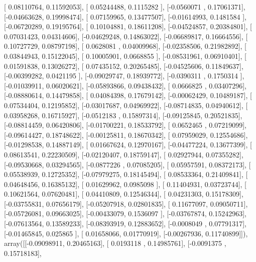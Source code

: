 \documentclass{article}
\begin{document}
       [ 0.08110764,  0.11592053],
       [ 0.05244488,  0.1115282 ],
       [-0.0560071 ,  0.17061371],
       [-0.04663628,  0.19998474],
       [ 0.07159965,  0.13477507],
       [-0.01614993,  0.1481584 ],
       [-0.06720289,  0.19195764],
       [ 0.10104881,  0.18611208],
       [-0.04524857,  0.20384801],
       [ 0.07031423,  0.04314606],
       [-0.04629248,  0.14863022],
       [-0.06689817,  0.16664556],
       [ 0.10727729,  0.08797198],
       [ 0.0628081 ,  0.04009968],
       [-0.02358506,  0.21982892],
       [ 0.03844943,  0.15122045],
       [ 0.10005901,  0.0668855 ],
       [-0.08531961,  0.06910401],
       [ 0.01591838,  0.13026272],
       [ 0.07435152,  0.20265485],
       [-0.04525606,  0.11849637],
       [-0.00399282,  0.0421195 ],
       [-0.09029747,  0.18939772],
       [-0.0390311 ,  0.1750314 ],
       [-0.01039911,  0.06020621],
       [-0.05893866,  0.09438432],
       [ 0.0666825 ,  0.03407296],
       [-0.08880614,  0.14479858],
       [ 0.04084398,  0.17679142],
       [-0.00062429,  0.10489187],
       [ 0.07534404,  0.12195852],
       [-0.03017687,  0.04969922],
       [-0.08714835,  0.04940612],
       [ 0.03958268,  0.16715927],
       [-0.0512183 ,  0.15897314],
       [-0.09125845,  0.20521835],
       [-0.08814459,  0.06420806],
       [-0.01700221,  0.18533792],
       [ 0.0652465 ,  0.07219099],
       [-0.09614427,  0.18748622],
       [-0.00125811,  0.18670342],
       [ 0.07959029,  0.12554686],
       [-0.01298538,  0.14887149],
       [ 0.01667624,  0.12970167],
       [-0.04477224,  0.13677399],
       [ 0.08613541,  0.22230509],
       [-0.02120407,  0.18759147],
       [ 0.02927944,  0.07355282],
       [-0.09530668,  0.03294565],
       [-0.0877226 ,  0.07085205],
       [ 0.05957591,  0.08372173],
       [ 0.05538939,  0.12725352],
       [-0.07979275,  0.18145494],
       [ 0.08533364,  0.21409841],
       [ 0.04648456,  0.16385132],
       [ 0.01629962,  0.0985098 ],
       [ 0.11404931,  0.03723744],
       [ 0.10621564,  0.07620481],
       [ 0.04410809,  0.12546344],
       [ 0.04231303,  0.15178309],
       [-0.03755831,  0.07656179],
       [-0.05207918,  0.02801835],
       [ 0.11677097,  0.09050711],
       [-0.05726081,  0.09663025],
       [-0.00433079,  0.1536097 ],
       [-0.03767874,  0.15242963],
       [-0.07613564,  0.13589233],
       [-0.08393919,  0.12883652],
       [-0.0008049 ,  0.07791317],
       [-0.01465845,  0.025865  ],
       [ 0.01658066,  0.01770919],
       [-0.00267936,  0.11740899]]), array([[-0.09098911,  0.20465163],
       [ 0.0193118 ,  0.14985761],
       [-0.0091375 ,  0.15718183],
\end{document}
